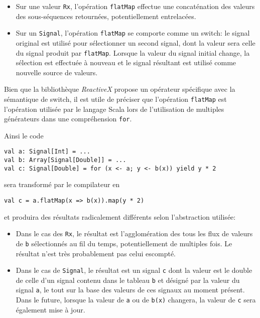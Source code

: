 \begin{itemize}
	\item Sur une valeur \texttt{Rx}, l'opération \texttt{flatMap} effectue une concaténation des valeurs des sous-séquences retournées, potentiellement entrelacées.
	\item Sur un \texttt{Signal}, l'opération \texttt{flatMap} se comporte comme un switch: le signal original est utilisé pour sélectionner un second signal, dont la valeur sera celle du signal produit par \texttt{flatMap}. Lorsque la valeur du signal initial change, la sélection est effectuée à nouveau et le signal résultant est utilisé comme nouvelle source de valeurs.
\end{itemize}

Bien que la bibliothèque \emph{ReactiveX} propose un opérateur spécifique avec la sémantique de switch, il est utile de préciser que l'opération \texttt{flatMap} est l'opération utilisée par le langage Scala lors de l'utilisation de multiples générateurs dans une compréhension \texttt{for}.

Ainsi le code
\begin{lstlisting}
val a: Signal[Int] = ...
val b: Array[Signal[Double]] = ...
val c: Signal[Double] = for (x <- a; y <- b(x)) yield y * 2
\end{lstlisting}

sera transformé par le compilateur en
\begin{lstlisting}
val c = a.flatMap(x => b(x)).map(y * 2)
\end{lstlisting}

et produira des résultats radicalement différents selon l'abstraction utilisée:

\begin{itemize}
	\item Dans le cas des \texttt{Rx}, le résultat est l'agglomération des tous les flux de valeurs de \texttt{b} sélectionnés au fil du temps, potentiellement de multiples fois. Le résultat n'est très probablement pas celui escompté.
	
	\item Dans le cas de \texttt{Signal}, le résultat est un signal \texttt{c} dont la valeur est le double de celle d'un signal contenu dans le tableau \texttt{b} et désigné par la valeur du signal \texttt{a}, le tout sur la base des valeurs de ces signaux au moment présent. Dans le future, lorsque la valeur de \texttt{a} ou de \texttt{b(x)} changera, la valeur de \texttt{c} sera également mise à jour.
\end{itemize}

